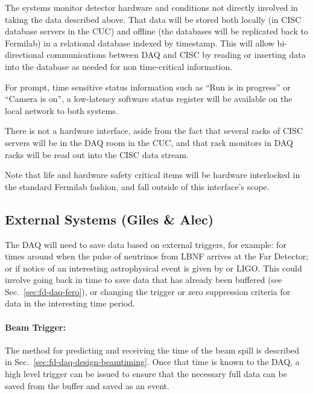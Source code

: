 The  systems monitor detector hardware and conditions not
directly involved in taking the data described above.
That data will be stored both locally (in CISC database servers in the
CUC) and offline (the databases will be replicated back to Fermilab)
in a relational database indexed by timestamp.
This will allow bi-directional communications between DAQ and CISC by
reading or inserting data into the database as needed for non
time-critical information.  

For prompt, time sensitive status information such as ``Run is in
progress'' or ``Camera is on'', a low-latency software status register
will be available on the local network to both systems.

There is not a hardware interface, aside from the fact that several
racks of CISC servers will be in the DAQ room in the CUC, and that rack
monitors in DAQ racks will be read out into the CISC data stream.

Note that life and hardware safety critical items will be hardware
interlocked in the standard Fermilab fashion, and fall outside of this
interface's scope.


\subsection{External Systems (Giles \& Alec)}
\label{sec:fd-daq-intfc-ext}


The DAQ will need to save data based on external triggers, for
example: for times around when the pulse of neutrinos from LBNF
arrives at the Far Detector; or if notice of an interesting
astrophysical event is given by \cite{snews} or LIGO.
This could involve going back in time to save data that has already
been buffered (see Sec.~\ref{sec:fd-daq-fero}), or changing the trigger
or zero suppression criteria for data in the interesting time period.


\paragraph{Beam Trigger:} The method for predicting and receiving the
time of the beam spill is described in
Sec.~\ref{sec:fd-daq-design-beamtiming}.
Once that time is known to the DAQ, a high level trigger can be issued
to ensure that the necessary full data can be saved from the buffer
and saved as an event.

